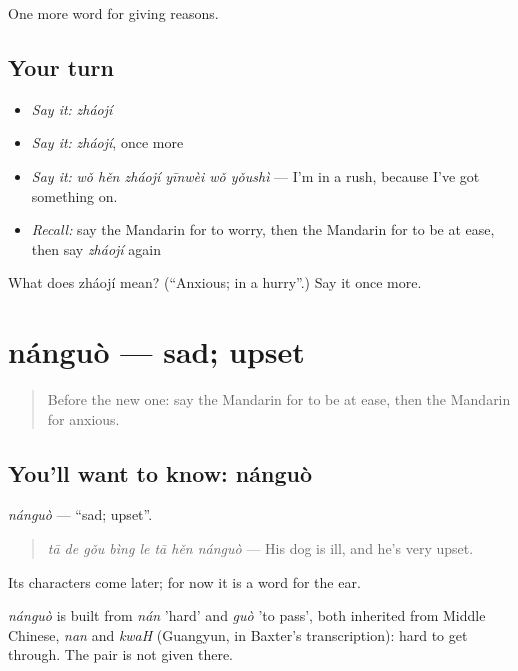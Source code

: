 \begin{grammarlens}[title={What you've built}]
One more word for giving reasons.
\end{grammarlens}

\subsection*{Your turn}
\begin{itemize}
\raggedright
  \item \emph{Say it:} \emph{zháojí}
  \item \emph{Say it:} \emph{zháojí}, once more
  \item \emph{Say it:} \emph{wǒ hěn zháojí yīnwèi wǒ yǒushì} — I'm in a rush, because I've got something on.
  \item \emph{Recall:} say the Mandarin for to worry, then the Mandarin for to be at ease, then say \emph{zháojí} again
\end{itemize}

\begin{tcolorbox}[breakable,colback=teal!4,colframe=teal!35!black,title={Before you move on}]
What does zháojí mean? (\textquotedblleft{}Anxious; in a hurry\textquotedblright{}.) Say it once more.
\end{tcolorbox}
\section[nánguò]{nánguò — sad; upset}

\label{lesson:ZH-C125-nanguo}



\begin{quote}
Before the new one: say the Mandarin for to be at ease, then the Mandarin for anxious.
\end{quote}

\subsection*{You'll want to know: nánguò}
\emph{nánguò} — \textquotedblleft{}sad; upset\textquotedblright{}.

\begin{quote}
\emph{tā de gǒu bìng le tā hěn nánguò} — His dog is ill, and he's very upset.
\end{quote}

Its characters come later; for now it is a word for the ear.

\begin{cousinweb}
\emph{nánguò} is built from \emph{nán} 'hard' and \emph{guò} 'to pass', both inherited from Middle Chinese, \emph{nan} and \emph{kwaH} (Guangyun, in Baxter's transcription): hard to get through. The pair is not given there.
\end{cousinweb}

